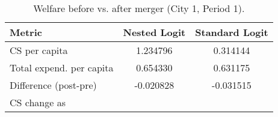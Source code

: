 \begin{table}[H]
\centering
\caption{Welfare before vs. after merger (City 1, Period 1).}
\begin{tabular}{lcc}
\toprule
Metric & Nested Logit & Standard Logit \\
\midrule
CS per capita & 1.234796 & 0.314144 \\
Total expend. per capita & 0.654330 & 0.631175 \\
Difference (post-pre) & -0.020828 & -0.031515 \\
CS change as %
\bottomrule
\end{tabular}
\label{tab:q24_nl_welfare}
\end{table}
